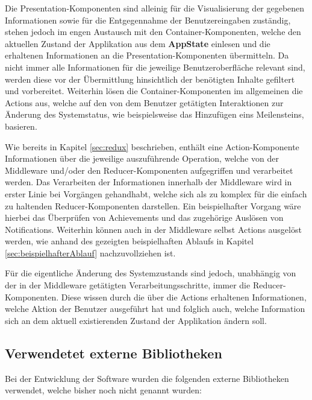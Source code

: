 \documentclass[bibliography=totoc,listof=totoc,BCOR=5mm,DIV=12,oneside]{scrbook}
\begin{document}
\par \bigskip Die Presentation-Komponenten sind alleinig für die Visualisierung der gegebenen Informationen sowie für die Entgegennahme der Benutzereingaben zuständig, stehen jedoch im engen Austausch mit den Container-Komponenten, welche den aktuellen Zustand der Applikation aus dem \textbf{AppState} einlesen und die erhaltenen Informationen an die Presentation-Komponenten übermitteln. Da nicht immer alle Informationen für die jeweilige Benutzeroberfläche relevant sind, werden diese vor der Übermittlung hinsichtlich der benötigten Inhalte gefiltert und vorbereitet. Weiterhin lösen die Container-Komponenten im allgemeinen die Actions aus, welche auf den von dem Benutzer getätigten Interaktionen zur Änderung des Systemstatus, wie beispielsweise das Hinzufügen eins Meilensteins, basieren.

\par \bigskip Wie bereits in Kapitel \ref{sec:redux} beschrieben, enthält eine Action-Komponente Informationen über die jeweilige auszuführende Operation, welche von der Middleware und/oder den Reducer-Komponenten aufgegriffen und verarbeitet werden. Das Verarbeiten der Informationen innerhalb der Middleware wird in erster Linie bei Vorgängen gehandhabt, welche sich als zu komplex für die einfach zu haltenden Reducer-Komponenten darstellen. Ein beispielhafter Vorgang wäre hierbei das Überprüfen von Achievements und das zugehörige Auslösen von Notifications. Weiterhin können auch in der Middleware selbst Actions ausgelöst werden, wie anhand des gezeigten beispielhaften Ablaufs in Kapitel \ref{sec:beispielhafterAblauf} nachzuvollziehen ist. 

\par \bigskip Für die eigentliche Änderung des Systemzustands sind jedoch, unabhängig von der in der Middleware getätigten Verarbeitungsschritte, immer die Reducer-Komponenten. Diese \grqq wissen\grqq{} durch die über die Actions erhaltenen Informationen, welche Aktion der Benutzer ausgeführt hat und folglich auch, welche Information sich an dem aktuell existierenden Zustand der Applikation ändern soll.

\subsection{Verwendetet externe Bibliotheken}
\par Bei der Entwicklung der Software wurden die folgenden externe Bibliotheken verwendet, welche bisher noch nicht genannt wurden:
\end{document}
